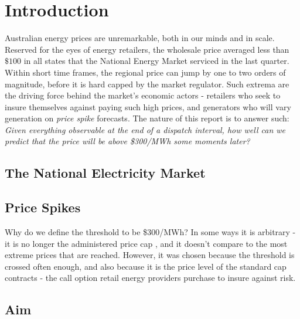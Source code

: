 \section{Introduction}\label{ch:introduction}

Australian energy prices are unremarkable, both in our minds and in scale. Reserved for the eyes of energy retailers, the wholesale price averaged less than $\$100$ in all states that the National Energy Market serviced in the last quarter. \cite{aercharts} Within short time frames, the regional price can jump by one to two orders of magnitude, before it is hard capped by the market regulator. Such extrema are the driving force behind the market's economic actors - retailers who seek to insure themselves against paying such high prices, and generators who will vary generation on \emph{price spike} forecasts. The nature of this report is to answer such: \emph{Given everything observable at the end of a dispatch interval, how well can we predict that the price will be above \$300/MWh some moments later?} 

\subsection{The National Electricity Market}\label{sec:NEM}

\subsection{Price Spikes}\label{sec:pricespike}
Why do we define the threshold to be \$300/MWh? In some ways it is arbitrary - it is no longer the administered price cap \cite{aemc2026}, and it doesn't compare to the most extreme prices that are reached. However, it was chosen because the threshold is crossed often enough, and also because it is the price level of the standard cap contracts - the call option retail energy providers purchase to insure against risk. \cite{aemcmarkets} 

\subsection{Aim}\label{sec:aim}
